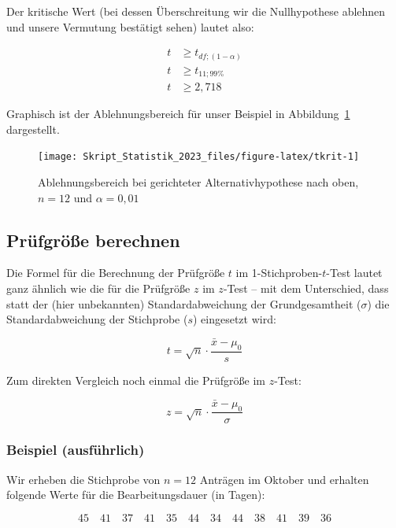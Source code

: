 \documentclass[
  11pt,
  ngerman,
  a4paper,
]{report}
\begin{document}
Der kritische Wert (bei dessen Überschreitung wir die Nullhypothese ablehnen und unsere Vermutung bestätigt sehen) lautet also:

\[
\begin{aligned}
t &\geq t_{\mathit{df};(1-\alpha)}\\[4pt]
t &\geq t_{11;99\%}\\[4pt]
t &\geq 2,718
\end{aligned}
\]

Graphisch ist der Ablehnungsbereich für unser Beispiel in Abbildung~\ref{fig:tkrit} dargestellt.

\begin{figure}[!h]

{\centering \texttt{[image: Skript\_Statistik\_2023\_files/figure-latex/tkrit-1]} 

}

\caption{Ablehnungsbereich bei gerichteter Alternativhypothese nach oben, $n=12$ und $\alpha=0{,}01$}\label{fig:tkrit}
\end{figure}

\hypertarget{pruxfcfgruxf6uxdfe-berechnen-1}{%
\subsection{Prüfgröße berechnen}\label{pruxfcfgruxf6uxdfe-berechnen-1}}

Die Formel für die Berechnung der Prüfgröße \(t\) im 1-Stichproben-\(t\)-Test lautet ganz ähnlich wie die für die Prüfgröße \(z\) im \(z\)-Test -- mit dem Unterschied, dass statt der (hier unbekannten) Standardabweichung der Grundgesamtheit (\(\sigma\)) die Standardabweichung der Stichprobe (\(s\)) eingesetzt wird:

\[
t=\sqrt{n}\cdot\frac{\bar{x}-\mu_0}{s}
\label{eq:t}
\]

Zum direkten Vergleich noch einmal die Prüfgröße im \(z\)-Test:

\[
z=\sqrt{n}\cdot\frac{\bar{x}-\mu_0}{\sigma}
\]

\hypertarget{beispiel-ausfuxfchrlich}{%
\subsubsection{Beispiel (ausführlich)}\label{beispiel-ausfuxfchrlich}}

Wir erheben die Stichprobe von \(n=12\) Anträgen im Oktober und erhalten folgende Werte für die Bearbeitungsdauer (in Tagen):

\[
45\quad41\quad37\quad41\quad35\quad44\quad34\quad44\quad38\quad41\quad39\quad36
\]
\end{document}

